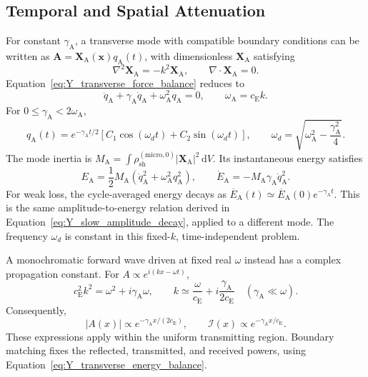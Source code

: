 \subsection{Temporal and Spatial Attenuation}
\label{sec:Y_attenuation_solutions}

For constant $\gamma_{\mathrm A}$, a transverse mode with compatible boundary conditions can be written as $\mathbf A=\mathbf X_{\mathrm A}(\mathbf x)q_{\mathrm A}(t)$, with dimensionless $\mathbf X_{\mathrm A}$ satisfying
\begin{equation}
    \nabla^2\mathbf X_{\mathrm A}=-k^2\mathbf X_{\mathrm A},
    \qquad \nabla\cdot\mathbf X_{\mathrm A}=0.
\end{equation}
Equation~\eqref{eq:Y_transverse_force_balance} reduces to
\begin{equation}
    \ddot q_{\mathrm A}+\gamma_{\mathrm A}\dot q_{\mathrm A}
    +\omega_{\mathrm A}^2q_{\mathrm A}=0,
    \qquad \omega_{\mathrm A}=c_{\mathrm E}k.
\end{equation}
For $0\leq\gamma_{\mathrm A}<2\omega_{\mathrm A}$,
\begin{equation}
    q_{\mathrm A}(t)=e^{-\gamma_{\mathrm A}t/2}
    \left[C_1\cos(\omega_dt)+C_2\sin(\omega_dt)\right],
    \qquad
    \omega_d=\sqrt{\omega_{\mathrm A}^2-\frac{\gamma_{\mathrm A}^2}{4}}.
    \label{eq:Y_temporal_attenuation}
\end{equation}
The mode inertia is $M_{\mathrm A}=\int\rho_{\mathrm{sh}}^{(\mathrm{micro},0)}|\mathbf X_{\mathrm A}|^2\,\mathrm dV$. Its instantaneous energy satisfies
\begin{equation}
    E_{\mathrm A}=\frac12M_{\mathrm A}
    \left(\dot q_{\mathrm A}^2+\omega_{\mathrm A}^2q_{\mathrm A}^2\right),
    \qquad
    \dot E_{\mathrm A}=-M_{\mathrm A}\gamma_{\mathrm A}\dot q_{\mathrm A}^2.
\end{equation}
For weak loss, the cycle-averaged energy decays as $\overline E_{\mathrm A}(t)\simeq\overline E_{\mathrm A}(0)e^{-\gamma_{\mathrm A}t}$. This is the same amplitude-to-energy relation derived in Equation~\eqref{eq:Y_slow_amplitude_decay}, applied to a different mode. The frequency $\omega_d$ is constant in this fixed-$k$, time-independent problem.

A monochromatic forward wave driven at fixed real $\omega$ instead has a complex propagation constant. For $A\propto e^{i(kx-\omega t)}$,
\begin{equation}
    c_{\mathrm E}^2k^2=\omega^2+i\gamma_{\mathrm A}\omega,
    \qquad
    k\simeq\frac{\omega}{c_{\mathrm E}}
    +i\frac{\gamma_{\mathrm A}}{2c_{\mathrm E}}
    \quad(\gamma_{\mathrm A}\ll\omega).
\end{equation}
Consequently,
\begin{equation}
    |A(x)|\propto e^{-\gamma_{\mathrm A}x/(2c_{\mathrm E})},
    \qquad
    \mathcal I(x)\propto e^{-\gamma_{\mathrm A}x/c_{\mathrm E}}.
    \label{eq:Y_spatial_attenuation}
\end{equation}
These expressions apply within the uniform transmitting region. Boundary matching fixes the reflected, transmitted, and received powers, using Equation~\eqref{eq:Y_transverse_energy_balance}.

